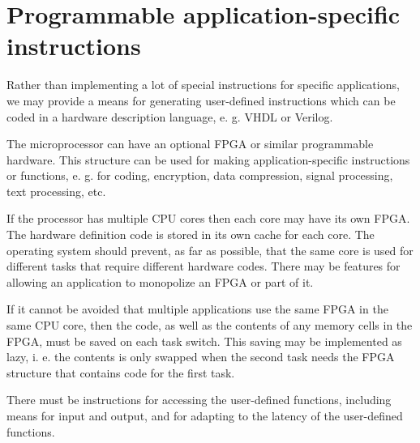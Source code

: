 \documentclass[forwardcom.tex]{subfiles}
\begin{document}
\RaggedRight

\chapter{Programmable application-specific instructions}
Rather than implementing a lot of special instructions for specific applications, we may provide a means for generating user-defined instructions which can be coded in a hardware description language, e. g. VHDL or Verilog. 
\vv

The microprocessor can have an optional FPGA or similar programmable hardware. This structure can be used for making application-specific instructions or functions, e. g. for coding, encryption, data compression, signal processing, text processing, etc. 
\vv

If the processor has multiple CPU cores then each core may have its own FPGA. The hardware definition code is stored in its own cache for each core. The operating system should prevent, as far as possible, that the same core is used for different tasks that require different hardware codes. There may be features for allowing an application to monopolize an FPGA or part of it. 
\vv

If it cannot be avoided that multiple applications use the same FPGA in the same CPU core, then the code, as well as the contents of any memory cells in the FPGA, must be saved on each task switch. This saving may be implemented as lazy, i. e. the contents is only swapped when the second task needs the FPGA structure that contains code for the first task. 
\vv

There must be instructions for accessing the user-defined functions, including means for input and output, and for adapting to the latency of the user-defined functions.
\end{document}
